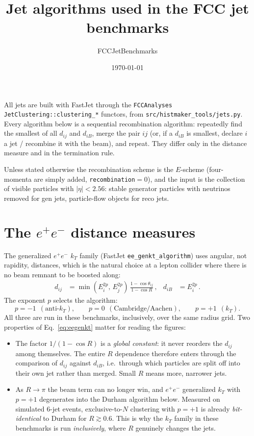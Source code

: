 \documentclass[11pt,a4paper]{article}
\title{Jet algorithms used in the FCC jet benchmarks}
\author{FCCJetBenchmarks}
\date{\today}
\newcommand{\ee}{$e^{+}e^{-}$}
\newcommand{\dij}{d_{ij}}
\newcommand{\diB}{d_{iB}}
\begin{document}
\maketitle

\noindent
All jets are built with FastJet through the \texttt{FCCAnalyses}
\texttt{JetClustering::clustering\_*} functors, from
\texttt{src/histmaker\_tools/jets.py}. Every algorithm below is a sequential
recombination algorithm: repeatedly find the smallest of all $\dij$ and $\diB$,
merge the pair $ij$ (or, if a $\diB$ is smallest, declare $i$ a jet / recombine
it with the beam), and repeat. They differ only in the distance measure and in
the termination rule.

Unless stated otherwise the recombination scheme is the $E$-scheme (four-momenta
are simply added, \texttt{recombination}${}=0$), and the input is the collection
of visible particles with $|\eta| < 2.56$: stable generator particles with
neutrinos removed for gen jets, particle-flow objects for reco jets.

\section*{The \ee{} distance measures}

The generalized \ee{} $k_T$ family (FastJet \texttt{ee\_genkt\_algorithm}) uses
angular, not rapidity, distances, which is the natural choice at a lepton
collider where there is no beam remnant to be boosted along:
\begin{align}
  \dij &= \min\!\left(E_i^{2p},\, E_j^{2p}\right)\,
          \frac{1 - \cos\theta_{ij}}{1 - \cos R}\,,
  &
  \diB &= E_i^{2p}\,.
  \label{eq:eegenkt}
\end{align}
The exponent $p$ selects the algorithm:
\[
  p = -1 \ \ (\text{anti-}k_T), \qquad
  p = 0 \ \ (\text{Cambridge/Aachen}), \qquad
  p = +1 \ \ (k_T).
\]
All three are run in these benchmarks, inclusively, over the same radius grid.
Two properties of Eq.~\eqref{eq:eegenkt} matter for reading the figures:

\begin{itemize}
  \item The factor $1/(1-\cos R)$ is a \emph{global constant}: it never reorders
        the $\dij$ among themselves. The entire $R$ dependence therefore enters
        through the comparison of $\dij$ against $\diB$, i.e.\ through which
        particles are split off into their own jet rather than merged. Small $R$
        means more, narrower jets.
  \item As $R \to \pi$ the beam term can no longer win, and \ee{} generalized
        $k_T$ with $p=+1$ degenerates into the Durham algorithm below. Measured
        on simulated 6-jet events, exclusive-to-$N$ clustering with $p=+1$ is
        already \emph{bit-identical} to Durham for $R \gtrsim 0.6$. This is why
        the $k_T$ family in these benchmarks is run \emph{inclusively}, where $R$
        genuinely changes the jets.
\end{itemize}
\end{document}
